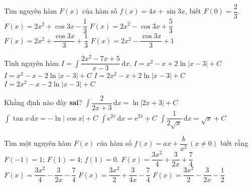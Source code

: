 \begin{ex}%
	Tìm nguyên hàm $F(x)$ của hàm số $f(x)=4x+\sin 3x$, biết $F(0)=\dfrac{2}{3}$. 
	\choice
	{$F(x)=2x^2+\cos 3x-\dfrac{1}{3}$}
	{$F(x)=2x^2-\cos 3x+\dfrac{5}{3}$}
	{$F(x)=2x^2+\dfrac{\cos 3x}{3}+\dfrac{1}{3}$}
	{\True $F(x)=2x^2-\dfrac{\cos 3x}{3}+1$}
\end{ex}
\begin{ex}%
	Tính nguyên hàm $I=\displaystyle\int\dfrac{2x^2-7x+5}{x-3}\mathrm{\,d}x$. 
	\choice
	{\True $I=x^2-x+2\ln|x-3|+C$}
	{$I=x^2-x-2\ln|x-3|+C$}
	{$I=2x^2-x+2\ln|x-3|+C$}
	{$I=2x^2-x-2\ln|x-3|+C$}
\end{ex}
\begin{ex}%
	Khẳng định nào đây \textbf{sai}? 
	\choice
	{$\displaystyle\int\dfrac{2}{2x+3}\mathrm{\,d}x=\ln|2x+3|+C$}
	{$\displaystyle\int\tan x\mathrm{\,d}x=-\ln|\cos x|+C$}
	{\True $\displaystyle\int\mathrm{e}^{2x}\mathrm{\,d}x=\mathrm{e}^{2x}+C$}
	{$\displaystyle\int\dfrac{1}{2\sqrt{x}}\mathrm{\,d}x=\sqrt{x}+C$}
\end{ex}
\begin{ex}%
	Tìm một nguyên hàm $F(x)$ của hàm số $f(x)=ax+\dfrac{b}{x^2} \, (x\neq 0)$ biết rằng $F(-1)=1$; $F(1)=4$; $f(1)=0$. 
	\choice
	{\True $F(x)=\dfrac{3x^2}{4}+\dfrac{3}{2x}+\dfrac{7}{4}$}
	{$F(x)=\dfrac{3x^2}{4}-\dfrac{3}{2x}-\dfrac{7}{4}$}
	{$F(x)=\dfrac{3x^2}{2}+\dfrac{3}{4x}-\dfrac{7}{4}$}
	{$F(x)=\dfrac{3x^2}{2}-\dfrac{3}{2x}-\dfrac{1}{2}$}
\end{ex}
